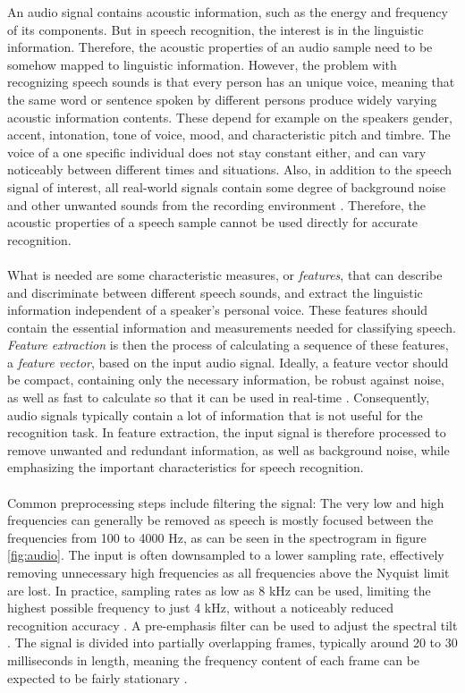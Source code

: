 \documentclass[english, 12pt, a4paper, pdftex, elec, utf8]{aaltothesis}
\begin{document}
An audio signal contains acoustic information, such as the energy and frequency of its components. But in speech recognition, the interest is in the linguistic information. Therefore, the acoustic properties of an audio sample need to be somehow mapped to linguistic information. However, the problem with recognizing speech sounds is that every person has an unique voice, meaning that the same word or sentence spoken by different persons produce widely varying acoustic information contents. These depend for example on the speakers gender, accent, intonation, tone of voice, mood, and characteristic pitch and timbre. The voice of a one specific individual does not stay constant either, and can vary noticeably between different times and situations. Also, in addition to the speech signal of interest, all real-world signals contain some degree of background noise and other unwanted sounds from the recording environment \cite{huang2001spoken}. Therefore, the acoustic properties of a speech sample cannot be used directly for accurate recognition. \\\\
What is needed are some characteristic measures, or \textit{features}, that can describe and discriminate between different speech sounds, and extract the linguistic information independent of a speaker's personal voice. These features should contain the essential information and measurements needed for classifying speech. \textit{Feature extraction} is then the process of calculating a sequence of these features, a \textit{feature vector}, based on the input audio signal. Ideally, a feature vector should be compact, containing only the necessary information, be robust against noise, as well as fast to calculate so that it can be used in real-time \cite{huang2001spoken}. Consequently, audio signals typically contain a lot of information that is not useful for the recognition task. In feature extraction, the input signal is therefore processed to remove unwanted and redundant information, as well as background noise, while emphasizing the important characteristics for speech recognition. \\\\
Common preprocessing steps include filtering the signal: The very low and high frequencies can generally be removed as speech is mostly focused between the frequencies from 100 to 4000 Hz, as can be seen in the spectrogram in figure \ref{fig:audio}. The input is often downsampled to a lower sampling rate, effectively removing unnecessary high frequencies as all frequencies above the Nyquist limit are lost. In practice, sampling rates as low as 8 kHz can be used, limiting the highest possible frequency to just 4 kHz, without a noticeably reduced recognition accuracy \cite{huang2001spoken}. A pre-emphasis filter can be used to adjust the spectral tilt \cite{kallasjoki2016}. The signal is divided into partially overlapping frames, typically around 20 to 30 milliseconds in length, meaning the frequency content of each frame can be expected to be fairly stationary \cite{huang2001spoken, gales2008application}. \\\\
\end{document}
